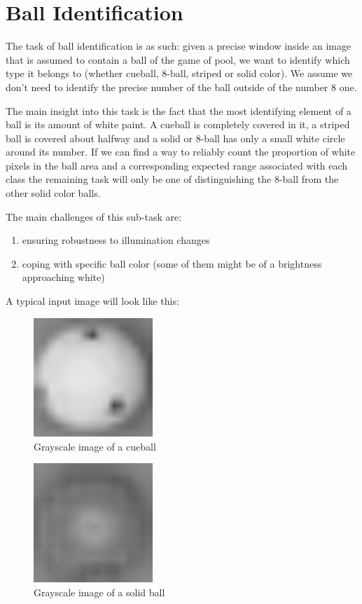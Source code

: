 
\section{Ball Identification}

The task of ball identification is as such: 
given a precise window inside an image that is assumed to 
contain a ball of the game of pool, we want to identify 
which type it belongs to (whether cueball, 8-ball, striped or 
solid color). We assume we don't need to identify the precise 
number of the ball outside of the number 8 one.

The main insight into this task is the fact that the most 
identifying element of a ball is its amount of white paint. 
A cueball is completely covered in it, a striped ball is 
covered about halfway and a solid or 8-ball has only a small 
white circle around its number. If we can find a way to 
reliably count the proportion of white pixels in the ball area 
and a corresponding expected range associated with each class 
the remaining task will only be one of distinguishing the 
8-ball from the other solid color balls.

The main challenges of this sub-task are:
\begin{enumerate}
  \item ensuring robustness to illumination changes
  \item coping with specific ball color 
  (some of them might be of a brightness approaching white)
\end{enumerate}

A typical input image will look like this:
\begin{figure}[h]
  \centering
  \includegraphics[width=0.4\textwidth]{./imgs/cueball_grey.png}
  \caption{Grayscale image of a cueball}
\end{figure}

\begin{figure}[h]
  \centering
  \includegraphics[width=0.4\textwidth]{./imgs/difficult_solid.png}
  \caption{Grayscale image of a solid ball}
\end{figure}

